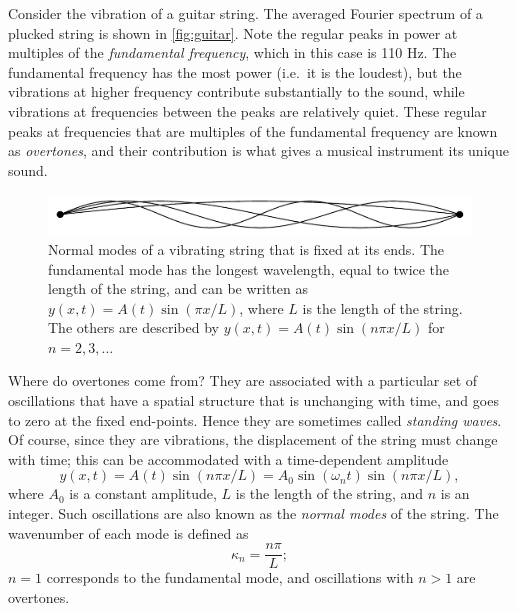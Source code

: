 \documentclass[11pt,twoside,a4paper]{article}
\begin{document}
Consider the vibration of a guitar string.  The averaged Fourier
spectrum of a plucked string is shown in \autoref{fig:guitar}. Note
the regular peaks in power at multiples of the \textit{fundamental
  frequency}, which in this case is 110 Hz.  The fundamental frequency
has the most power (i.e.~it is the loudest), but the vibrations at
higher frequency contribute substantially to the sound, while
vibrations at frequencies between the peaks are relatively quiet.
These regular peaks at frequencies that are multiples of the
fundamental frequency are known as \textit{overtones}, and their
contribution is what gives a musical instrument its unique sound.

\begin{figure}[ht]
  \centering
  \includegraphics[width=\textwidth]{../figs/L16/NormalModes.pdf}
  \caption{Normal modes of a vibrating string that is fixed at its
    ends. The fundamental mode has the longest wavelength, equal to
    twice the length of the string, and can be written as $y(x,t) =
    A(t)\sin\left(\pi x/L\right)$, where $L$ is the length of the
    string. The others are described by $y(x,t) = A(t)\sin\left(n\pi
      x/L\right)$ for $n=2,3,...$}
  \label{fig:normalmodes}
\end{figure}

Where do overtones come from?  They are associated with a particular
set of oscillations that have a spatial structure that is unchanging
with time, and goes to zero at the fixed end-points. Hence they are
sometimes called \textit{standing waves}. Of course, since they are
vibrations, the displacement of the string must change with time; this
can be accommodated with a time-dependent amplitude
\begin{equation}
  \label{eq:string}
  y(x,t) = A(t)\sin\left(n\pi x/L\right) = A_0\sin(\omega_nt)
  \sin\left(n\pi x/L\right),
\end{equation}
where $A_0$ is a constant amplitude, $L$ is the length of the string,
and $n$ is an integer. Such oscillations are also known as the
\textit{normal modes} of the string. The wavenumber of each mode is
defined as
\begin{displaymath}
  \kappa_n = \frac{n\pi}{L};
\end{displaymath}
$n=1$ corresponds to the fundamental mode, and oscillations with $n>1$
are overtones.
\end{document}

